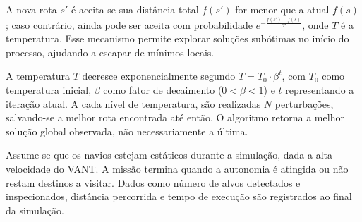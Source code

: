 A nova rota $s'$ é aceita se sua distância total $f(s')$ for menor que a atual $f(s)$; caso contrário, ainda pode ser aceita com probabilidade $e^{-\frac{f(s') - f(s)}{T}}$, onde $T$ é a temperatura. Esse mecanismo permite explorar soluções subótimas no início do processo, ajudando a escapar de mínimos locais.

A temperatura $T$ decresce exponencialmente segundo $T = T_0 \cdot \beta^t$, com $T_0$ como temperatura inicial, $\beta$ como fator de decaimento ($0 < \beta < 1$) e $t$ representando a iteração atual. A cada nível de temperatura, são realizadas $N$ perturbações, salvando-se a melhor rota encontrada até então. O algoritmo retorna a melhor solução global observada, não necessariamente a última.

Assume-se que os navios estejam estáticos durante a simulação, dada a alta velocidade do VANT. A missão termina quando a autonomia é atingida ou não restam destinos a visitar. Dados como número de alvos detectados e inspecionados, distância percorrida e tempo de execução são registrados ao final da simulação.


